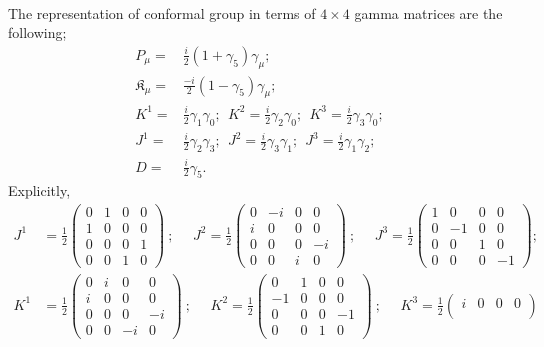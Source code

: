 \\

The representation of conformal group in terms of $4\times4$ gamma matrices are the following;
\begin{align}
    P_\mu=&\frac{i}{2}(1+\gamma_5)\gamma_\mu;\\
    \mathfrak{K}_\mu=&\frac{-i}{2}(1-\gamma_5)\gamma_\mu;\\
    K^1=&\frac{i}{2}\gamma_1\gamma_0;~~K^2=\frac{i}{2}\gamma_2\gamma_0;~~K^3=\frac{i}{2}\gamma_3\gamma_0;\\
    J^1=&\frac{i}{2}\gamma_2\gamma_3;~~J^2=\frac{i}{2}\gamma_3\gamma_1;~~J^3=\frac{i}{2}\gamma_1\gamma_2;\\
    D=&\frac{i}{2}\gamma_5.
\end{align}
Explicitly,
\begin{align*}
    J^{1}&=\frac{1}{2}\begin{pmatrix}
    0&1&0&0\\
    1&0&0&0\\
    0&0&0&1\\
    0&0&1&0
    \end{pmatrix}~;~~~~~~J^{2}=\frac{1}{2}\begin{pmatrix}
    0&-i&0&0\\
    i&0&0&0\\
    0&0&0&-i\\
    0&0&i&0
    \end{pmatrix}~;~~~~~~J^{3}=\frac{1}{2}\begin{pmatrix}
    1&0&0&0\\
    0&-1&0&0\\
    0&0&1&0\\
    0&0&0&-1
    \end{pmatrix};\\
    K^{1}&=\frac{1}{2}\begin{pmatrix}
    0&i&0&0\\
    i&0&0&0\\
    0&0&0&-i\\
    0&0&-i&0
    \end{pmatrix}~;~~~~~~K^{2}=\frac{1}{2}\begin{pmatrix}
    0&1&0&0\\
    -1&0&0&0\\
    0&0&0&-1\\
    0&0&1&0
    \end{pmatrix}~;~~~~~~K^{3}=\frac{1}{2}\begin{pmatrix}
    i&0&0&0\\

\end{pmatrix}
\end{align*}
